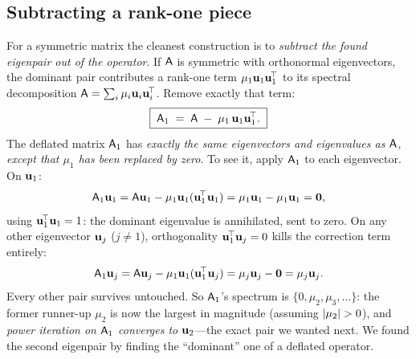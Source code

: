 \subsection{Subtracting a rank-one piece}
\label{sec:def-ranköne}

For a symmetric matrix the cleanest construction is to \emph{subtract the found
eigenpair out of the operator}. If $\mathsf{A}$ is symmetric with orthonormal
eigenvectors, the dominant pair contributes a rank-one term $\mu_1\mathbf{u}_1\mathbf{u}_1^{\!\top}$
to its spectral decomposition $\mathsf{A}=\sum_i \mu_i\mathbf{u}_i\mathbf{u}_i^{\!\top}$. Remove
exactly that term:
\begin{equation}
  \boxed{\;\mathsf{A}_1 \;=\; \mathsf{A} \;-\; \mu_1\,\mathbf{u}_1\mathbf{u}_1^{\!\top}.\;}
  \label{eq:deflate-rank1}
\end{equation}
The deflated matrix $\mathsf{A}_1$ has \emph{exactly the same eigenvectors and
eigenvalues as $\mathsf{A}$, except that $\mu_1$ has been replaced by zero}. To see
it, apply $\mathsf{A}_1$ to each eigenvector. On $\mathbf{u}_1$:
\begin{equation}
  \mathsf{A}_1\mathbf{u}_1
    = \mathsf{A}\mathbf{u}_1 - \mu_1\mathbf{u}_1(\mathbf{u}_1^{\!\top}\mathbf{u}_1)
    = \mu_1\mathbf{u}_1 - \mu_1\mathbf{u}_1
    = \mathbf 0,
\end{equation}
using $\mathbf{u}_1^{\!\top}\mathbf{u}_1=1$: the dominant eigenvalue is annihilated, sent to
zero. On any other eigenvector $\mathbf{u}_j$ ($j\neq1$), orthogonality
$\mathbf{u}_1^{\!\top}\mathbf{u}_j=0$ kills the correction term entirely:
\begin{equation}
  \mathsf{A}_1\mathbf{u}_j
    = \mathsf{A}\mathbf{u}_j - \mu_1\mathbf{u}_1(\mathbf{u}_1^{\!\top}\mathbf{u}_j)
    = \mu_j\mathbf{u}_j - \mathbf 0
    = \mu_j\mathbf{u}_j .
\end{equation}
Every other pair survives untouched. So $\mathsf{A}_1$'s spectrum is
$\{0,\mu_2,\mu_3,\dots\}$: the former runner-up $\mu_2$ is now the largest in
magnitude (assuming $\lvert\mu_2\rvert>0$), and \emph{power iteration on $\mathsf{A}_1$
converges to $\mathbf{u}_2$}---the exact pair we wanted next. We found the second
eigenpair by finding the ``dominant'' one of a deflated operator.

